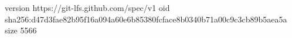 version https://git-lfs.github.com/spec/v1
oid sha256:d47d3fae82b95f16a094a60e6b85380fcface8b0340b71a00c9c3cb89b5aea5a
size 5566
